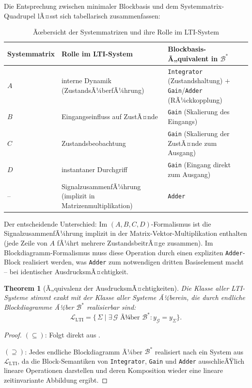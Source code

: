 ﻿\documentclass[12pt,a4paper]{article}
\newtheorem{theorem}{Theorem}[section]
\theoremstyle{definition}
\begin{document}
Die Entsprechung zwischen minimaler Blockbasis und dem Systemmatrix-Quadrupel
lÃ¤sst sich tabellarisch zusammenfassen:

\begin{table}
\centering
\renewcommand{\arraystretch}{1.25}
\begin{tabular}{llp{5.5cm}}
  \toprule
  \textbf{Systemmatrix} & \textbf{Rolle im LTI-System}
    & \textbf{Blockbasis-Ã„quivalent in $\mathcal{B}^*$} \\
  \midrule
  $A$ & interne Dynamik (ZustandsÃ¼berfÃ¼hrung)
    & \texttt{Integrator} (Zustandshaltung) $+$
      \texttt{Gain}/\texttt{Adder} (RÃ¼ckkopplung) \\
  $B$ & Eingangseinfluss auf ZustÃ¤nde
    & \texttt{Gain} (Skalierung des Eingangs) \\
  $C$ & Zustandsbeobachtung
    & \texttt{Gain} (Skalierung der ZustÃ¤nde zum Ausgang) \\
  $D$ & instantaner Durchgriff
    & \texttt{Gain} (Eingang direkt zum Ausgang) \\
  \midrule
  --  & SignalzusammenfÃ¼hrung (implizit in Matrizenmultiplikation)
    & \texttt{Adder} \\
  \bottomrule
\end{tabular}
\caption{Ãœbersicht der Systemmatrizen und ihre Rolle im LTI-System}
\label{tab:overview}
\end{table}

\smallskip
Der entscheidende Unterschied: Im $(A,B,C,D)$-Formalismus ist die
SignalzusammenfÃ¼hrung implizit in der Matrix-Vektor-Multiplikation enthalten
(jede Zeile von $A$ fÃ¼hrt mehrere ZustandsbeitrÃ¤ge zusammen). Im
Blockdiagramm-Formalismus muss diese Operation durch einen expliziten
\texttt{Adder}-Block realisiert werden, was \texttt{Adder} zum notwendigen
dritten Basiselement macht -- bei identischer AusdrucksmÃ¤chtigkeit.

\begin{theorem}[Ã„quivalenz der AusdrucksmÃ¤chtigkeiten]
\label{thm:aequivalenz}
Die Klasse aller LTI-Systeme stimmt exakt mit der Klasse aller Systeme
Ã¼berein, die durch endliche Blockdiagramme Ã¼ber $\mathcal{B}^*$ realisierbar
sind:
\[
  \mathcal{L}_{\mathrm{LTI}}
  = \bigl\{\,\Sigma \;\big|\;
    \exists\,\mathcal{G} \text{ Ã¼ber } \mathcal{B}^* : y_{\mathcal{G}} = y_{\Sigma}
  \bigr\}.
\]
\end{theorem}

\begin{proof}
$(\subseteq)$: Folgt direkt aus .

$(\supseteq)$: Jedes endliche Blockdiagramm Ã¼ber $\mathcal{B}^*$ realisiert
nach  ein System aus $\mathcal{L}_{\mathrm{LTI}}$, da die
Block-Semantiken von \texttt{Integrator}, \texttt{Gain} und \texttt{Adder}
ausschlieÃŸlich lineare Operationen darstellen und deren Komposition wieder
eine lineare zeitinvariante Abbildung ergibt.
\end{proof}
\end{document}
